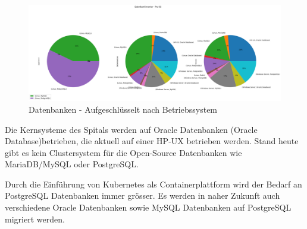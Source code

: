 

\begin{figure}[H]
    \centering
    \includegraphics[width=1\linewidth]{source/pandas_data_chart_plotter/db_inventory_per_os}
    \caption{Datenbanken - Aufgeschlüsselt nach Betriebssystem}
    \label{fig:db_inventory_per_os}
\end{figure}

Die Kernsysteme des Spitals werden auf Oracle Datenbanken (\Gls{Oracle Database})betrieben, die aktuell auf einer \Gls{HP-UX} betrieben werden.
Stand heute gibt es kein Clustersystem für die Open-Source Datenbanken wie \Gls{MariaDB}/\Gls{MySQL} oder \Gls{PostgreSQL}\@.

Durch die Einführung von \Gls{Kubernetes} als Containerplattform wird der Bedarf an \Gls{PostgreSQL} Datenbanken immer grösser.
Es werden in naher Zukunft auch verschiedene Oracle Datenbanken sowie \Gls{MySQL} Datenbanken auf \Gls{PostgreSQL} migriert werden.

